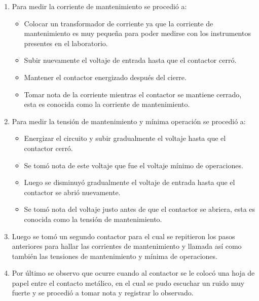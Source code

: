 \begin{enumerate}
    \item Para medir la corriente de mantenimiento se procedió a:
    \begin{itemize}
        \item Colocar un transformador de corriente ya que la corriente de mantenimiento es muy pequeña para poder medirse con los instrumentos presentes en el laboratorio.
        \item Subir nuevamente el voltaje de entrada hasta que el contactor cerró. 
        \item Mantener el contactor energizado después del cierre.
        \item Tomar nota de la corriente mientras el contactor se mantiene cerrado, esta es conocida como la corriente de mantenimiento.
    \end{itemize}

    \item Para medir la tensión de mantenimiento y mínima operación se procedió a:
    \begin{itemize}
        \item Energizar el circuito y subir gradualmente el voltaje hasta que el contactor cerró.
        \item Se tomó nota de este voltaje que fue el voltaje mínimo de operaciones.
        \item Luego se disminuyó gradualmente el voltaje de entrada hasta que el contactor se abrió nuevamente.
        \item Se tomó nota del voltaje justo antes de que el contactor se abriera, esta es conocida como la tensión de mantenimiento.
    \end{itemize}

    \item Luego se tomó un segundo contactor para el cual se repitieron los pasos anteriores para hallar las corrientes de mantenimiento y llamada así como también las tensiones de mantenimiento y mínima de operaciones.
    \item Por último se observo que ocurre cuando al contactor se le colocó una hoja de papel entre el contacto metálico, en el cual se pudo escuchar un ruido muy fuerte y se procedió a tomar nota y registrar lo observado.
\end{enumerate}
